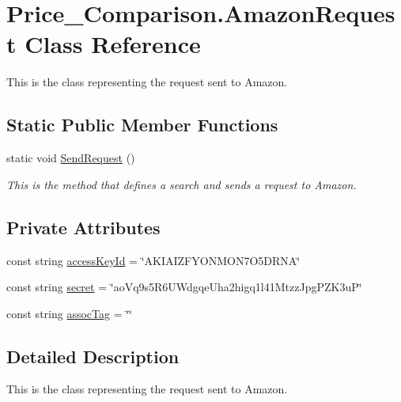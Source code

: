 \hypertarget{class_price___comparison_1_1_amazon_request}{\section{Price\-\_\-\-Comparison.\-Amazon\-Request Class Reference}
\label{class_price___comparison_1_1_amazon_request}
}


This is the class representing the request sent to Amazon.  


\subsection*{Static Public Member Functions}
\begin{DoxyCompactItemize}
\item 
static void \hyperlink{class_price___comparison_1_1_amazon_request_aa0193ad27df62215081663c5f26813b6}{Send\-Request} ()
\begin{DoxyCompactList}\small\item\em This is the method that defines a search and sends a request to Amazon. \end{DoxyCompactList}\end{DoxyCompactItemize}
\subsection*{Private Attributes}
\begin{DoxyCompactItemize}
\item 
const string \hyperlink{class_price___comparison_1_1_amazon_request_ae6439e3c8506b3b5549c2b5784afb430}{access\-Key\-Id} = \char`\"{}A\-K\-I\-A\-I\-Z\-F\-Y\-O\-N\-M\-O\-N7\-O5\-D\-R\-N\-A\char`\"{}
\item 
const string \hyperlink{class_price___comparison_1_1_amazon_request_a7579fb44ab93ada136d11eb887ebd0ef}{secret} = \char`\"{}ao\-Vq9s5\-R6\-U\-Wdgqe\-Uha2higq1l41\-Mtzz\-Jpg\-P\-Z\-K3u\-P\char`\"{}
\item 
const string \hyperlink{class_price___comparison_1_1_amazon_request_a6002b57f55377cdbd2c22d4a2690ea46}{assoc\-Tag} = \char`\"{}\char`\"{}
\end{DoxyCompactItemize}


\subsection{Detailed Description}
This is the class representing the request sent to Amazon. 

